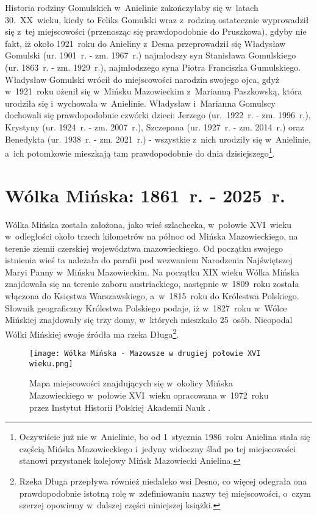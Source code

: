 Historia rodziny Gomulskich w~Anielinie zakończyłaby się w~latach 30.~XX~wieku,
kiedy to Feliks Gomulski wraz z~rodziną ostatecznie wyprowadził się 
z~tej miejscowości (przenosząc się prawdopodobnie do Pruszkowa), gdyby nie 
fakt, iż około 1921~roku do Anieliny z~Desna przeprowadził się Władysław 
Gomulski (ur. 1901~r. - zm. 1967~r.) najmłodszy syn Stanisława Gomulskiego 
(ur. 1863~r. - zm. 1929~r.), najmłodszego syna Piotra Franciszka Gumulskiego.
Władysław Gomulski wrócił do miejscowości narodzin swojego ojca, gdyż
w~1921~roku ożenił się w~Mińsku Mazowieckim z~Marianną Paszkowską, która 
urodziła się i~wychowała w~Anielinie. Władysław i~Marianna Gomulscy dochowali 
się prawdopodobnie czwórki dzieci: Jerzego (ur.~1922~r. - zm. 1996~r.),
Krystyny (ur. 1924~r. - zm. 2007~r.), Szczepana (ur. 1927~r. - zm. 2014~r.)
oraz Benedykta (ur. 1938~r. - zm. 2021~r.) - wszystkie z~nich urodziły się 
w~Anielinie, a~ich potomkowie mieszkają tam prawdopodobnie do dnia
dzisiejszego\footnote{Oczywiście już nie w~Anielinie, bo od 1~stycznia
1986~roku Anielina stała się częścią Mińska Mazowieckiego i~jedyny widoczny
ślad po tej miejscowości stanowi przystanek kolejowy Mińsk Mazowiecki 
Anielina.}.



\section{Wólka Mińska: 1861~r. - 2025~r.}

Wólka Mińska została założona, jako wieś szlachecka, w~połowie XVI~wieku 
w~odległości około trzech kilometrów na północ od Mińska Mazowieckiego,
na terenie ziemii czerskiej województwa mazowieckiego. Od początku swojego 
istnienia wieś ta należała do parafii pod wezwaniem Narodzenia Najświętszej 
Maryi Panny w~Mińsku Mazowieckim. Na początku XIX wieku Wólka Mińska 
znajdowała się na terenie zaboru austriackiego, następnie w~1809~roku została 
włączona do Księstwa Warszawskiego, a~w~1815~roku do Królestwa Polskiego. 
Słownik geograficzny Królestwa Polskiego podaje, iż w~1827~roku w~Wólce 
Mińskiej znajdowały się trzy domy, w~których mieszkało 25~osób. Nieopodal 
Wólki Mińskiej swoje źródła ma rzeka Długa\footnote{Rzeka Długa przepływa
również niedaleko wsi Desno, co więcej odegrała ona prawdopodobnie 
istotną rolę w~zdefiniowaniu nazwy tej miejscowości, o~czym szerzej opowiemy 
w~dalszej części niniejszej książki.}.

\begin{figure}[!ht]
    \vspace*{0.5cm}
    \centering \texttt{[image: 
        Wólka Mińska - Mazowsze w drugiej połowie XVI wieku.png]}
    \captionsetup{format=hang}
    \caption{Mapa miejscowości znajdujących się w~okolicy Mińska Mazowieckiego 
    w~połowie XVI~wieku opracowana w~1972~roku przez Instytut Historii 
    Polskiej Akademii Nauk \cite{palucki}.}
    \label{fig:wolka_minska_xvi}
\end{figure}

